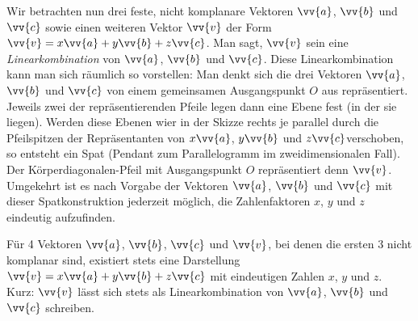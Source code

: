 \begin{marginfigure}
\end{marginfigure}
Wir betrachten nun drei feste, nicht komplanare Vektoren $\vv{a}$, $\vv{b}$ und $\vv{c}$ sowie einen weiteren Vektor $\vv{v}$ der Form $\vv{v} = x \vv{a} + y \vv{b} + z \vv{c}$. Man sagt, $\vv{v}$ sein eine \textit{Linearkombination} von $\vv{a}$, $\vv{b}$ und $\vv{c}$. Diese Linearkombination kann man sich räumlich so vorstellen: Man denkt sich die drei Vektoren $\vv{a}$, $\vv{b}$ und $\vv{c}$ von einem gemeinsamen Ausgangspunkt $O$ aus repräsentiert. Jeweils zwei der repräsentierenden Pfeile legen dann eine Ebene fest (in der sie liegen). Werden diese Ebenen wier in der Skizze rechts je parallel durch die Pfeilspitzen der Repräsentanten von $x \vv{a}$, $y \vv{b}$ und $z \vv{c}$verschoben, so entsteht ein Spat (Pendant zum Parallelogramm im zweidimensionalen Fall). Der Körperdiagonalen-Pfeil mit Ausgangspunkt $O$ repräsentiert denn $\vv{v}$. Umgekehrt ist es nach Vorgabe der Vektoren $\vv{a}$, $\vv{b}$ und $\vv{c}$ mit dieser Spatkonstruktion jederzeit möglich, die Zahlenfaktoren $x$, $y$ und $z$ eindeutig aufzufinden.

\begin{mainTheorem}[Basissatz]\label{theorem:basis}
Für 4 Vektoren $\vv{a}$, $\vv{b}$, $\vv{c}$ und $\vv{v}$, bei denen die ersten 3 nicht komplanar sind, existiert stets eine Darstellung $\vv{v} = x \vv{a} + y \vv{b} + z \vv{c} $ mit eindeutigen Zahlen $x$, $y$ und $z$. Kurz: $\vv{v}$ lässt sich stets als Linearkombination von $\vv{a}$, $\vv{b}$ und $\vv{c}$ schreiben.
\end{mainTheorem}

